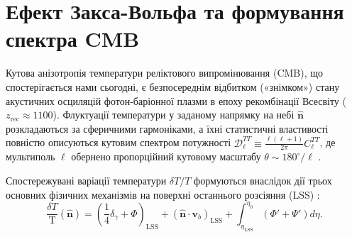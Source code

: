 

\chapter{Ефект Закса-Вольфа та формування спектра CMB}
\label{sec:sachs}

Кутова анізотропія температури реліктового випромінювання (CMB), що спостерігається нами сьогодні, є безпосереднім відбитком («знімком») стану акустичних осциляцій фотон-баріонної плазми в епоху рекомбінації Всесвіту ($z_{\mathrm{rec}} \approx 1100$). Флуктуації температури у заданому напрямку на небі $\hat{\mathbf{n}}$ розкладаються за сферичними гармоніками, а їхні статистичні властивості повністю описуються кутовим спектром потужності $\mathcal{D}_\ell^{TT} \equiv \frac{\ell(\ell+1)}{2\pi}C_\ell^{TT}$, де мультиполь $\ell$ обернено пропорційний кутовому масштабу $\theta \sim 180^\circ / \ell$ \cite{dodelson_2020}.

Спостережувані варіації температури $\delta T / T$ формуються внаслідок дії трьох основних фізичних механізмів на поверхні останнього розсіяння (LSS) \cite{hu_sugiyama_1995}:
\begin{equation}\label{eq:cmb_sources}
  \frac{\delta T}{\text{T}}(\hat{\mathbf{n}}) = \left( \frac{1}{4}\delta_\gamma + \Phi \right)_{\mathrm{LSS}} + \left( \hat{\mathbf{n}} \cdot \mathbf{v}_b \right)_{\mathrm{LSS}} + \int_{\eta_{\mathrm{LSS}}}^{\eta_0} \left( \Phi' + \Psi' \right) d\eta.
\end{equation}

